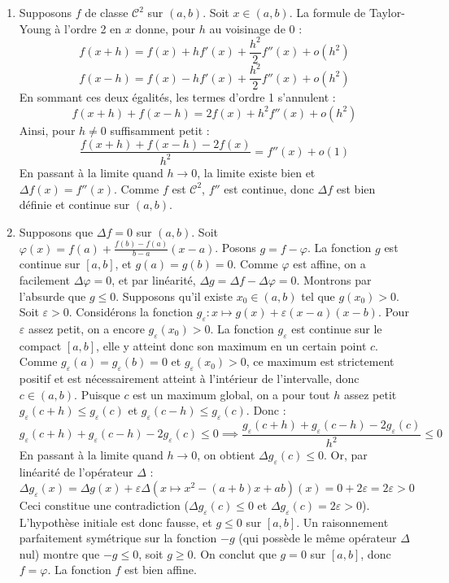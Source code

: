 \begin{solution}
    \begin{enumerate}
        \item Supposons $f$ de classe $\mathcal C^2$ sur $(a,b)$. Soit $x \in (a,b)$. La formule de Taylor-Young à l'ordre 2 en $x$ donne, pour $h$ au voisinage de $0$ :
        \[
            f(x+h) = f(x) + hf'(x) + \frac{h^2}{2}f''(x) + o(h^2)
        \]
        \[
            f(x-h) = f(x) - hf'(x) + \frac{h^2}{2}f''(x) + o(h^2)
        \]
        En sommant ces deux égalités, les termes d'ordre 1 s'annulent :
        \[
            f(x+h) + f(x-h) = 2f(x) + h^2 f''(x) + o(h^2)
        \]
        Ainsi, pour $h \neq 0$ suffisamment petit :
        \[
            \frac{f(x+h)+f(x-h)-2f(x)}{h^2} = f''(x) + o(1)
        \]
        En passant à la limite quand $h \to 0$, la limite existe bien et $\Delta f(x) = f''(x)$. Comme $f$ est $\mathcal C^2$, $f''$ est continue, donc $\Delta f$ est bien définie et continue sur $(a,b)$.

        \item Supposons que $\Delta f = 0$ sur $(a,b)$. 
        Soit $\varphi(x) = f(a) + \frac{f(b)-f(a)}{b-a}(x-a)$. Posons $g = f - \varphi$.
        La fonction $g$ est continue sur $[a,b]$, et $g(a) = g(b) = 0$. Comme $\varphi$ est affine, on a facilement $\Delta \varphi = 0$, et par linéarité, $\Delta g = \Delta f - \Delta \varphi = 0$.
        Montrons par l'absurde que $g \leq 0$. Supposons qu'il existe $x_0 \in (a,b)$ tel que $g(x_0) > 0$.
        Soit $\varepsilon > 0$. Considérons la fonction $g_\varepsilon : x \mapsto g(x) + \varepsilon(x-a)(x-b)$. 
        Pour $\varepsilon$ assez petit, on a encore $g_\varepsilon(x_0) > 0$. 
        La fonction $g_\varepsilon$ est continue sur le compact $[a,b]$, elle y atteint donc son maximum en un certain point $c$. 
        Comme $g_\varepsilon(a) = g_\varepsilon(b) = 0$ et $g_\varepsilon(x_0) > 0$, ce maximum est strictement positif et est nécessairement atteint à l'intérieur de l'intervalle, donc $c \in (a,b)$.
        Puisque $c$ est un maximum global, on a pour tout $h$ assez petit $g_\varepsilon(c+h) \leq g_\varepsilon(c)$ et $g_\varepsilon(c-h) \leq g_\varepsilon(c)$.
        Donc :
        \[
            g_\varepsilon(c+h) + g_\varepsilon(c-h) - 2g_\varepsilon(c) \leq 0 \implies \frac{g_\varepsilon(c+h) + g_\varepsilon(c-h) - 2g_\varepsilon(c)}{h^2} \leq 0
        \]
        En passant à la limite quand $h \to 0$, on obtient $\Delta g_\varepsilon(c) \leq 0$.
        Or, par linéarité de l'opérateur $\Delta$ :
        \[
            \Delta g_\varepsilon(x) = \Delta g(x) + \varepsilon \Delta(x \mapsto x^2 - (a+b)x + ab)(x) = 0 + 2\varepsilon = 2\varepsilon > 0
        \]
        Ceci constitue une contradiction ($\Delta g_\varepsilon(c) \leq 0$ et $\Delta g_\varepsilon(c) = 2\varepsilon > 0$).
        L'hypothèse initiale est donc fausse, et $g \leq 0$ sur $[a,b]$.
        Un raisonnement parfaitement symétrique sur la fonction $-g$ (qui possède le même opérateur $\Delta$ nul) montre que $-g \leq 0$, soit $g \geq 0$.
        On conclut que $g = 0$ sur $[a,b]$, donc $f = \varphi$. La fonction $f$ est bien affine.


\end{enumerate}
\end{solution}
